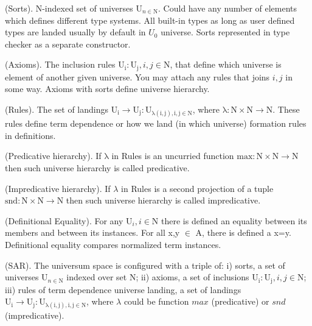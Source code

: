\begin{definition} (Sorts). N-indexed set of universes $\mathrm{U}_{n \in \mathrm{N}}$.
Could have any number of elements which defines different type systems. All built-in
types as long as user defined types are landed usually by default in $U_0$ universe.
Sorts represented in type checker as a separate constructor.
\end{definition}

\begin{definition} (Axioms). The inclusion rules \textbf{$\mathrm{U_i : U_j}, i,j \in \mathrm{N}$},
that define which universe is element of another given universe. You may attach
any rules that joins $i,j$ in some way. Axioms with sorts define universe hierarchy.
\end{definition}

\begin{definition} (Rules). The set of landings
$\mathrm{U_i} \rightarrow \mathrm{U_j} : \mathrm{U_{\lambda(i,j), i,j \in \mathrm{N}}}$,
where $\mathrm{\lambda : N \times N \rightarrow N}$. These rules define term dependence or
how we land (in which universe) formation rules in definitions.
\end{definition}

\begin{definition} (Predicative hierarchy). If $\mathrm{\lambda}$ in Rules
is an uncurried function $\mathrm{max : N \times N \rightarrow N}$
then such universe hierarchy is called predicative.
\end{definition}

\begin{definition} (Impredicative hierarchy). If $\lambda$ in Rules
is a second projection of a tuple $\mathrm{snd : N \times N \rightarrow N}$
then such universe hierarchy is called impredicative.
\end{definition}

\begin{definition} (Definitional Equality). For any $\mathrm{U}_i, i \in \mathrm{N}$ there is
defined an equality between its members and between its instances.
For all x,y $\in$ A, there is defined a x=y. Definitional equality
compares normalized term instances.
\end{definition}

\begin{definition} (SAR). The universum space is configured with a triple of:
i) sorts, a set of universes  $\mathrm{U}_{n \in \mathrm{N}}$ indexed over set N;
ii) axioms, a set of inclusions \textbf{$\mathrm{U_i : U_j}, i,j \in \mathrm{N}$};
iii) rules of term dependence universe landing, a set of landings
$\mathrm{U_i} \rightarrow \mathrm{U_j} : \mathrm{U_{\lambda(i,j), i,j \in \mathrm{N}}}$, where $\lambda$ could be function $max$ (predicative) or $snd$ (impredicative).
\end{definition}

